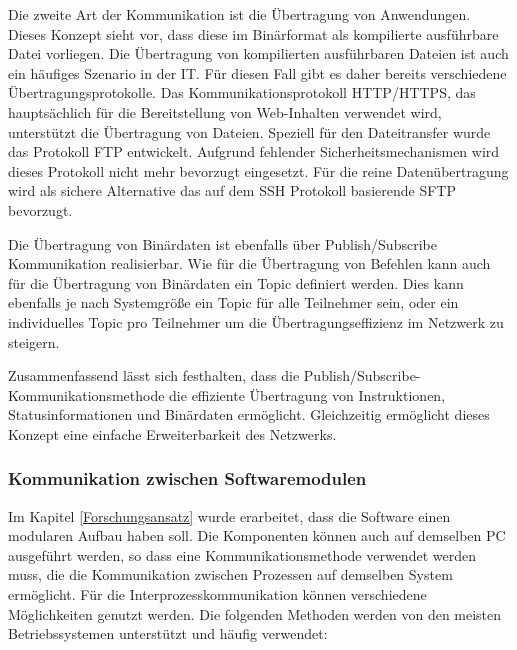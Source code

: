 Die zweite Art der Kommunikation ist die Übertragung von Anwendungen. Dieses Konzept sieht vor, dass diese im Binärformat als kompilierte ausführbare Datei vorliegen. Die Übertragung von kompilierten ausführbaren Dateien ist auch ein häufiges Szenario in der \gls{IT}. Für diesen Fall gibt es daher bereits verschiedene Übertragungsprotokolle. Das Kommunikationsprotokoll \gls{HTTP}/\gls{HTTPS}, das hauptsächlich für die Bereitstellung von Web-Inhalten verwendet wird, unterstützt die Übertragung von Dateien. Speziell für den Dateitransfer wurde das Protokoll \gls{FTP} entwickelt. Aufgrund fehlender Sicherheitsmechanismen wird dieses Protokoll nicht mehr bevorzugt eingesetzt. Für die reine Datenübertragung wird als sichere Alternative das auf dem \gls{SSH} Protokoll basierende \gls{SFTP} bevorzugt.

Die Übertragung von Binärdaten ist ebenfalls über Publish/Subscribe Kommunikation realisierbar. Wie für die Übertragung von Befehlen kann auch für die Übertragung von Binärdaten ein Topic definiert werden. Dies kann ebenfalls je nach Systemgröße ein Topic für alle Teilnehmer sein, oder ein individuelles Topic pro Teilnehmer um die Übertragungseffizienz im Netzwerk zu steigern. 

Zusammenfassend lässt sich festhalten, dass die Publish/Subscribe-Kommunikationsmethode die effiziente Übertragung von Instruktionen, Statusinformationen und Binärdaten ermöglicht. Gleichzeitig ermöglicht dieses Konzept eine einfache Erweiterbarkeit des Netzwerks.

\subsubsection{Kommunikation zwischen Softwaremodulen}
\label{Kommunikation zwischen Softwaremodulen}

Im Kapitel \autoref{Forschungsansatz} wurde erarbeitet, dass die Software einen modularen Aufbau haben soll. Die Komponenten können auch auf demselben PC ausgeführt werden, so dass eine Kommunikationsmethode verwendet werden muss, die die Kommunikation zwischen Prozessen auf demselben System ermöglicht. Für die Interprozesskommunikation können verschiedene Möglichkeiten genutzt werden. Die folgenden Methoden werden von den meisten Betriebssystemen unterstützt und häufig verwendet:

